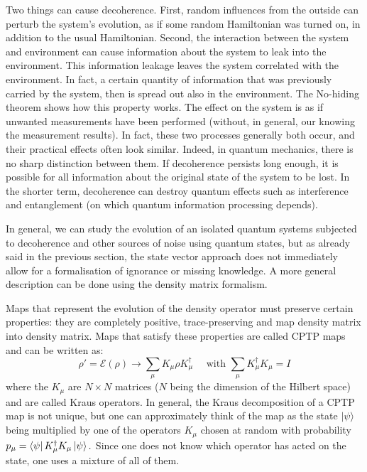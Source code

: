 Two things can cause decoherence. First, random influences from the outside can perturb the system's evolution, as if some random Hamiltonian was turned on, in addition to the usual Hamiltonian. Second, the interaction between the system and environment can cause information about the system to leak into the environment. This information leakage leaves the system correlated with the environment. In fact, a certain quantity of information that was previously carried by the system, then is spread out also in the environment. The No-hiding theorem shows how this property works. The effect on the system is as if unwanted measurements have been performed (without, in general, our knowing the measurement results).
In fact, these two processes generally both occur, and their practical effects often look similar. Indeed, in quantum mechanics, there is no sharp distinction between them. If decoherence persists long enough, it is possible for all information about the original state of the system to be lost. In the shorter term, decoherence can destroy quantum effects such as interference and entanglement (on which quantum information processing depends).

In general, we can study the evolution of an isolated quantum systems subjected to decoherence and other sources of noise using quantum states, but as already said in the previous section, the state vector approach does not immediately allow for a formalisation of ignorance or missing knowledge. A more general description can be done using the density matrix formalism.

Maps that represent the evolution of the density operator must preserve certain properties: they are completely positive, trace-preserving and map density matrix into density matrix.
Maps that satisfy these properties are called CPTP maps and can be written as:
$$
\rho' = \mathcal{E}(\rho) \rightarrow \sum_{\mu} K_{\mu} \rho K_{\mu}^{\dagger} \quad \text { with } \sum_{\mu} K_{\mu}^{\dagger} K_{\mu}=I
$$
where the $K_{\mu}$ are $N \times N$ matrices ($N$ being the dimension of the Hilbert space) and are called Kraus operators. 
In general, the Kraus decomposition of a CPTP map is not unique, but one can approximately think of the map as the state $|\psi\rangle$ being multiplied by one of the operators $K_{\mu}$ chosen at random with probability $p_{\mu}=\bra{\psi} K_{\mu}^{\dagger} K_{\mu}\ket{\psi} .$ Since one does not know which operator has acted on the state, one uses a mixture of all of them.


